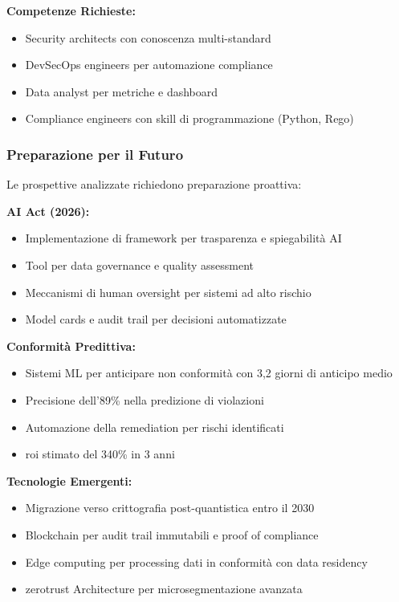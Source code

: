 \textbf{Competenze Richieste:}
\begin{itemize}
    \item Security architects con conoscenza multi-standard
    \item DevSecOps engineers per automazione compliance
    \item Data analyst per metriche e dashboard
    \item Compliance engineers con skill di programmazione (Python, Rego)
\end{itemize}

\subsubsection{Preparazione per il Futuro}

Le prospettive analizzate richiedono preparazione proattiva:

\textbf{AI Act (2026):}
\begin{itemize}
    \item Implementazione di framework per trasparenza e spiegabilità AI
    \item Tool per data governance e quality assessment
    \item Meccanismi di human oversight per sistemi ad alto rischio
    \item Model cards e audit trail per decisioni automatizzate
\end{itemize}

\textbf{Conformità Predittiva:}
\begin{itemize}
    \item Sistemi ML per anticipare non conformità con 3,2 giorni di anticipo medio
    \item Precisione dell'89\% nella predizione di violazioni
    \item Automazione della remediation per rischi identificati
    \item \gls{roi} stimato del 340\% in 3 anni
\end{itemize}

\textbf{Tecnologie Emergenti:}
\begin{itemize}
    \item Migrazione verso crittografia post-quantistica entro il 2030
    \item Blockchain per audit trail immutabili e proof of compliance
    \item Edge computing per processing dati in conformità con data residency
    \item \gls{zerotrust} Architecture per microsegmentazione avanzata
\end{itemize}

